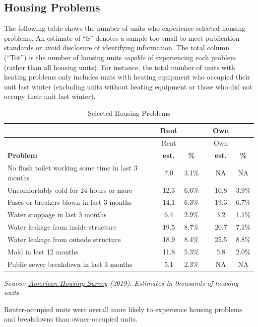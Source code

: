 \documentclass[
]{book}
\begin{document}
\hypertarget{housing-problems}{%
\subsection{Housing Problems}\label{housing-problems}}

The following table shows the number of units who experience selected housing problems. An estimate of ``S'' denotes a sample too small to meet publication standards or avoid disclosure of identifying information. The total column (``Tot'') is the number of housing units \emph{capable} of experiencing each problem (rather than all housing units). For instance, the total number of units with heating problems only includes units with heating equipment who occupied their unit last winter (excluding units without heating equipment or those who did not occupy their unit last winter).

\begin{longtable}[]{@{}lccccc@{}}
\caption{Selected Housing Problems}\tabularnewline
\toprule
& Rent & & & Own & \\
\midrule
\endfirsthead
\toprule
& Rent & & & Own & \\
\midrule
\endhead
\textbf{Problem} & \textbf{est.} & \textbf{\%} & & \textbf{est.} & \textbf{\%} \\
No flush toilet working some time in last 3 months & 7.0 & 3.1\% & & NA & NA \\
Uncomfortably cold for 24 hours or more & 12.3 & 6.6\% & & 10.8 & 3.9\% \\
Fuses or breakers blown in last 3 months & 14.1 & 6.3\% & & 19.3 & 6.7\% \\
Water stoppage in last 3 months & 6.4 & 2.9\% & & 3.2 & 1.1\% \\
Water leakage from inside structure & 19.5 & 8.7\% & & 20.7 & 7.1\% \\
Water leakage from outside structure & 18.9 & 8.4\% & & 25.5 & 8.8\% \\
Mold in last 12 months & 11.8 & 5.3\% & & 5.8 & 2.0\% \\
Public sewer breakdown in last 3 months & 5.1 & 2.3\% & & NA & NA \\
\bottomrule
\end{longtable}

\emph{Source: \href{https://www.census.gov/newsroom/press-releases/2020/2019-american-housing-survey.html}{American Housing Survey} (2019). Estimates in thousands of housing units.}

Renter-occupied units were overall more likely to experience housing problems and breakdowns than owner-occupied units.
\end{document}
